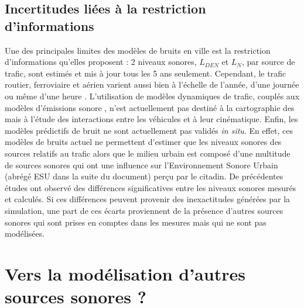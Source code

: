
\subsection{Incertitudes liées à la restriction d'informations}

Une des principales limites des modèles de bruits en ville est la restriction d'informations qu'elles proposent : 2 niveaux sonores, $L_{DEN}$ et $L_N$, par source de trafic, sont estimés et mis à jour  tous les 5 ans seulement. Cependant, le trafic routier, ferroviaire et aérien varient aussi bien à l'échelle de l'année, d'une journée ou même d'une heure \cite{lv2015traffic}.
L'utilisation de modèles dynamiques de trafic, couplés aux modèles d'émissions sonore  \cite{can2010traffic}, n'est actuellement pas destiné à la cartographie des  mais à l'étude des interactions entre les véhicules et à leur cinématique.
Enfin, les modèles prédictifs de bruit ne sont actuellement pas validés \textit{in situ}. En effet, ces modèles de bruits actuel ne permettent d'estimer que les niveaux sonores des sources relatifs au trafic alors que le milieu urbain est composé d'une multitude de sources sonores qui ont une influence sur l'Environnement Sonore Urbain (abrégé ESU dans la suite du document) perçu par le citadin. De précédentes études \cite{Mioduszewski, zannin_characterization_2013} ont observé des différences significatives entre les niveaux sonores mesurés et calculés. Si ces différences peuvent provenir des inexactitudes générées par la simulation, une part de ces écarts proviennent de la présence d'autres sources sonores qui sont prises en comptes dans les mesures mais qui ne sont pas modélisées.\\


\section{Vers la modélisation d'autres sources sonores ?}

